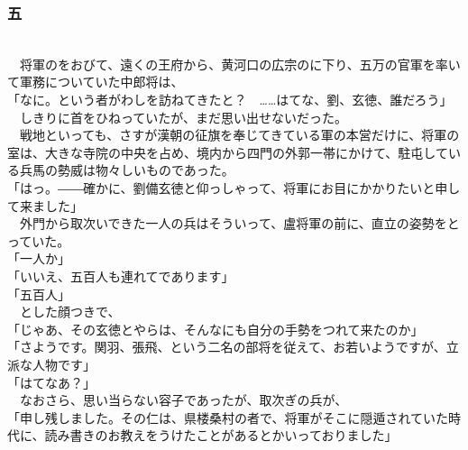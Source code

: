 \documentclass[
  paper=a5,
  fontsize=10pt,
  jafontsize=9.5pt,
  tate,                  %
  open_bracket_pos=nibu, %
]{jlreq}
\begin{document}
\subsubsection{五}

\\


　将軍のをおびて、遠くの王府から、黄河口の広宗のに下り、五万の官軍を率いて軍務についていた中郎将は、\\


「なに。という者がわしを訪ねてきたと？　……はてな、劉、玄徳、誰だろう」\\


　しきりに首をひねっていたが、まだ思い出せないだった。\\


　戦地といっても、さすが漢朝の征旗を奉じてきている軍の本営だけに、将軍の室は、大きな寺院の中央を占め、境内から四門の外郭一帯にかけて、駐屯している兵馬の勢威は物々しいものであった。\\


「はっ。――確かに、劉備玄徳と仰っしゃって、将軍にお目にかかりたいと申して来ました」\\


　外門から取次いできた一人の兵はそういって、盧将軍の前に、直立の姿勢をとっていた。\\


「一人か」\\


「いいえ、五百人も連れてであります」\\


「五百人」\\


　とした顔つきで、\\


「じゃあ、その玄徳とやらは、そんなにも自分の手勢をつれて来たのか」\\


「さようです。関羽、張飛、という二名の部将を従えて、お若いようですが、立派な人物です」\\


「はてなあ？」\\


　なおさら、思い当らない容子であったが、取次ぎの兵が、\\


「申し残しました。その仁は、県楼桑村の者で、将軍がそこに隠遁されていた時代に、読み書きのお教えをうけたことがあるとかいっておりました」\\
\end{document}
